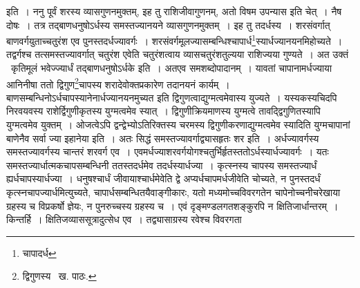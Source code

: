\documentclass[11pt, openany]{book}
\begin{document}
\noindent इति~। ननु पूर्वं शरस्य व्यासगुणनमुक्तम्, इह तु राशिजीवागुणनम्, अतो विषम उपन्यास इति चेत्~। नैष दोषः~। तत्र तद्बाणधनुषोऽर्धस्य समस्तज्यानयने व्यासगुणनमुक्तम्~। इह तु तदर्धस्य~। शरसंवर्गात् बाणवर्गयुताच्चतुरंश एव पुनस्तदर्धज्यावर्गः~।
शरसंवर्गमूलज्यासम्बन्धिश्चापार्ध\renewcommand{\thefootnote}{३}\footnote{चापादर्ध}स्यार्धज्यानयनमिहोच्यते~। तद्वर्गश्च तत्समस्तज्यावर्गात् चतुरंश एवेति चतुरंशत्वाय व्यासचतुरंशतुल्यया राशिज्यया गुण्यते~। अत उक्तं \textendash\ {\qt कृतिमूलं भवेज्ज्यार्धं तद्बाणधनुषोऽर्धके} इति~। अतएव समशब्दोपादानम्~। यावतां चापानामर्धज्याया आनिनीषा ततो द्विगुण\renewcommand{\thefootnote}{४}\footnote{द्विगुणस्य \textendash\ ख. पाठः.}चापस्य शरादेवोक्तप्रकारेण तदानयनं कार्यम्~। बाणसम्बन्धिनोऽर्धचापस्यानेनार्धज्यानयनमुच्यत इति द्विगुणत्वाद्युग्मत्वमेवास्य युज्यते~। यस्यकस्यचिदपि निरवयवस्य राशेर्द्विगुणीकृतस्य युग्मत्वमेव स्यात्~। द्विगुणीक्रियमाणस्य युग्मत्वे तावद्द्विगुणितस्यापि युग्मत्वमेव युक्तम्~। ओजत्वेऽपि द्वन्द्वेभ्योऽतिरिक्तस्य चरमस्य द्विगुणीकरणाद्युग्मत्वमेव स्यादिति युग्मचापानां बाणेनैव सर्वा ज्या इहानेया इति~। अतः सिद्धं {\qt समस्तज्यावर्गाद्व्यासहृतः शर} इति~। अर्धज्यावर्गस्य समस्तज्यावर्गस्य चान्तरं शरवर्ग एव~। एवमर्धज्याशरवर्गयोगश्चतुर्भिर्हृतस्ततोऽर्धस्यार्धज्यावर्गः~। यतः समस्तज्यार्धात्मकचापसम्बन्धिनी ततस्तदर्धमेव तदर्धस्यार्धज्या~। कृत्स्नस्य चापस्य समस्तज्यार्धं ह्यर्धचापस्यार्धज्या~। धनुषश्चार्धं जीवायाश्चार्धमेवेति द्वे अप्यर्धचापमर्धजीवेति चोच्यते, न पुनस्तदर्धं कृत्स्नचापज्यार्धमित्युच्यते, चापार्धसम्बन्धितयैवाङ्गीकारः, यतो मध्यमोच्चविवरगतेन चापेनोच्चनीचरेखाया ग्रहस्य च विप्रकर्षो ज्ञेयः, न पुनरुच्चस्य ग्रहस्य च~। एवं दृङ्मण्डलगतशङ्कुरपि न क्षितिजार्धान्तरम्~। किन्तर्हि~। क्षितिजव्याससूत्रादुत्सेध एव~। तद्व्यासाग्रस्य रवेश्च विवरगता

\newpage
\end{document}
